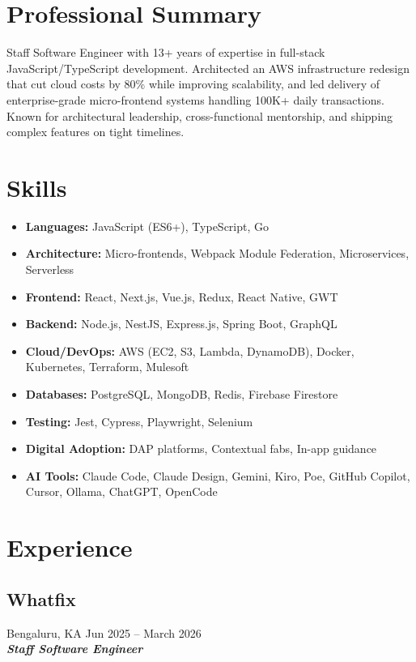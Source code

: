\documentclass[10pt,a4paper]{article}
\begin{document}
\thispagestyle{fancy}

\section*{Professional Summary}
Staff Software Engineer with 13+ years of expertise in full-stack JavaScript/TypeScript development. Architected an AWS infrastructure redesign that cut cloud costs by 80\% while improving scalability, and led delivery of enterprise-grade micro-frontend systems handling 100K+ daily transactions. Known for architectural leadership, cross-functional mentorship, and shipping complex features on tight timelines.

\section*{Skills}
\begin{itemize}[leftmargin=*, nosep]
  \item \textbf{Languages:} JavaScript (ES6+), TypeScript, Go
  \item \textbf{Architecture:} Micro-frontends, Webpack Module Federation, Microservices, Serverless
  \item \textbf{Frontend:} React, Next.js, Vue.js, Redux, React Native, GWT
  \item \textbf{Backend:} Node.js, NestJS, Express.js, Spring Boot, GraphQL
  \item \textbf{Cloud/DevOps:} AWS (EC2, S3, Lambda, DynamoDB), Docker, Kubernetes, Terraform, Mulesoft
  \item \textbf{Databases:} PostgreSQL, MongoDB, Redis, Firebase Firestore
  \item \textbf{Testing:} Jest, Cypress, Playwright, Selenium
  \item \textbf{Digital Adoption:} DAP platforms, Contextual fabs, In-app guidance
  \item \textbf{AI Tools:} Claude Code, Claude Design, Gemini, Kiro, Poe, GitHub Copilot, Cursor, Ollama, ChatGPT, OpenCode
\end{itemize}

\section*{Experience}

\subsection*{\large Whatfix}
\textcolor{datecolor}{Bengaluru, KA \textbar Jun 2025 -- March 2026} \\
\textbf{\textit{Staff Software Engineer}}
\end{document}
